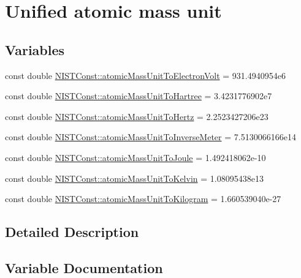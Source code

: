 \hypertarget{group___n_i_s_t_const-_atomic_mass_unit}{}\section{Unified atomic mass unit}
\label{group___n_i_s_t_const-_atomic_mass_unit}
\subsection*{Variables}
\begin{DoxyCompactItemize}
\item 
const double \mbox{\hyperlink{group___n_i_s_t_const-_atomic_mass_unit_ga4a5d912289e6a828a25e9e7ae3385b0d}{N\+I\+S\+T\+Const\+::atomic\+Mass\+Unit\+To\+Electron\+Volt}} = 931.\+4940954e6
\item 
const double \mbox{\hyperlink{group___n_i_s_t_const-_atomic_mass_unit_ga8a6b352e1a13d0cbbc0f36f650e2c682}{N\+I\+S\+T\+Const\+::atomic\+Mass\+Unit\+To\+Hartree}} = 3.\+4231776902e7
\item 
const double \mbox{\hyperlink{group___n_i_s_t_const-_atomic_mass_unit_gad284f1982f0182e1e4a90e0bff793af9}{N\+I\+S\+T\+Const\+::atomic\+Mass\+Unit\+To\+Hertz}} = 2.\+2523427206e23
\item 
const double \mbox{\hyperlink{group___n_i_s_t_const-_atomic_mass_unit_gae1f5517810a5df9365d26887c04ada40}{N\+I\+S\+T\+Const\+::atomic\+Mass\+Unit\+To\+Inverse\+Meter}} = 7.\+5130066166e14
\item 
const double \mbox{\hyperlink{group___n_i_s_t_const-_atomic_mass_unit_gaea7c1916a35df8824ac6a67be3f65f33}{N\+I\+S\+T\+Const\+::atomic\+Mass\+Unit\+To\+Joule}} = 1.\+492418062e-\/10
\item 
const double \mbox{\hyperlink{group___n_i_s_t_const-_atomic_mass_unit_gaf9c3a2dfd69d4e74cee3361abd7d7ecf}{N\+I\+S\+T\+Const\+::atomic\+Mass\+Unit\+To\+Kelvin}} = 1.\+08095438e13
\item 
const double \mbox{\hyperlink{group___n_i_s_t_const-_atomic_mass_unit_gafdd40d93803d15e1ff887dc12c49ca99}{N\+I\+S\+T\+Const\+::atomic\+Mass\+Unit\+To\+Kilogram}} = 1.\+660539040e-\/27
\end{DoxyCompactItemize}


\subsection{Detailed Description}


\subsection{Variable Documentation}
\mbox{\label{group___n_i_s_t_const-_atomic_mass_unit_ga4a5d912289e6a828a25e9e7ae3385b0d}} 

